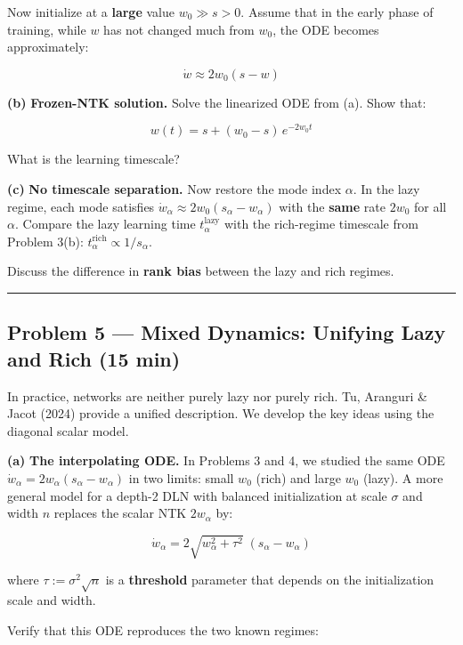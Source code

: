 \documentclass[
]{article}
\begin{document}
Now initialize at a \textbf{large} value \(w_0 \gg s > 0\). Assume that in
the early phase of training, while \(w\) has not changed much from
\(w_0\), the ODE becomes approximately:

\[\dot{w} \approx 2w_0(s - w)\]

\textbf{(b)} \textbf{Frozen-NTK solution.} Solve the linearized ODE from
(a). Show that:

\[w(t) = s + (w_0 - s)\,e^{-2w_0 t}\]

What is the learning timescale?

\textbf{(c)} \textbf{No timescale separation.} Now restore the mode
index \(\alpha\). In the lazy regime, each mode satisfies
\(\dot{w}_\alpha \approx 2w_0(s_\alpha - w_\alpha)\) with the
\textbf{same} rate \(2w_0\) for all \(\alpha\). Compare the lazy
learning time \(t_\alpha^{\text{lazy}}\) with the rich-regime timescale
from Problem 3(b): \(t_\alpha^{\text{rich}} \propto 1/s_\alpha\).

Discuss the difference in \textbf{rank bias} between the lazy and rich
regimes.

\begin{center}\rule{0.5\linewidth}{0.5pt}\end{center}

\subsection{Problem 5 --- Mixed Dynamics: Unifying Lazy and Rich (15
min)}\label{problem-5-mixed-dynamics-unifying-lazy-and-rich-15-min}

In practice, networks are neither purely lazy nor purely rich. Tu,
Aranguri \& Jacot (2024) provide a unified description. We develop the
key ideas using the diagonal scalar model.

\textbf{(a)} \textbf{The interpolating ODE.} In Problems 3 and 4, we
studied the same ODE \(\dot{w}_\alpha = 2w_\alpha(s_\alpha - w_\alpha)\)
in two limits: small \(w_0\) (rich) and large \(w_0\) (lazy). A more
general model for a depth-2 DLN with balanced initialization at scale
\(\sigma\) and width \(n\) replaces the scalar NTK \(2w_\alpha\) by:

\[\dot{w}_\alpha = 2\sqrt{w_\alpha^2 + \tau^2}\;(s_\alpha - w_\alpha)\]

where \(\tau := \sigma^2 \sqrt{n}\) is a \textbf{threshold} parameter
that depends on the initialization scale and width.

Verify that this ODE reproduces the two known regimes:
\end{document}
